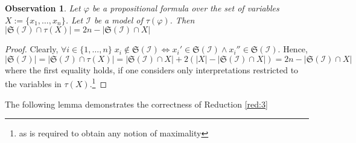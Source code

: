 \documentclass [11pt]{article}
\newtheorem{observation}[theorem]{Observation}
\begin{document}
\begin{observation}
\label{obs:2}
Let $\varphi$ be a propositional formula over the set of variables $X:=\{x_1,\dots , x_n\}$. Let $\mathcal{I}$ be a model of $\tau(\varphi)$. Then $|\mathfrak{S}(\mathcal{I})\cap\tau(X)| = 2n-|\mathfrak{S}(\mathcal{I}) \cap X|$
\end{observation}
\begin{proof}
Clearly, $\forall i \in \{1,\dots , n\}  \; x_i \notin \mathfrak{S}(\mathcal{I}) \iff x_i' \in \mathfrak{S}(\mathcal{I}) \land x_i'' \in \mathfrak{S}(\mathcal{I})$. 
Hence, 
\begin{equation*}
|\mathfrak{S}(\mathcal{I})| = |\mathfrak{S}(\mathcal{I})\cap\tau(X)|  = |\mathfrak{S}(\mathcal{I}) \cap X| + 2(|X| -  |\mathfrak{S}(\mathcal{I}) \cap X|) = 2n- |\mathfrak{S}(\mathcal{I}) \cap X|
\end{equation*}
where the first equality holds, if one considers only interpretations restricted to the variables in $\tau(X)$.\footnote{as is required to obtain any notion of maximality}
\end{proof}

The following lemma demonstrates the correctness of Reduction \ref{red:3}
\end{document}

